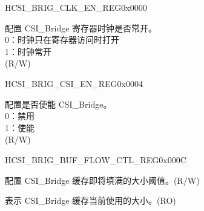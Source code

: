 \begin{register}{H}{CSI\_BRIG\_CLK\_EN\_REG}{0x0000}\label{regdesc:CSIBRIGCLKENREG}
%
%
\regnewline%
\begin{regdesc}\begin{reglist}
\label{fielddesc:CSIBRIGCLKEN}\item [CSI\_BRIG\_CLK\_EN] 配置 CSI\_Bridge 寄存器时钟是否常开。\\0：时钟只在寄存器访问时打开\\1：时钟常开\\(R/W)
\end{reglist}\end{regdesc}
\end{register}


\begin{register}{H}{CSI\_BRIG\_CSI\_EN\_REG}{0x0004}\label{regdesc:CSIBRIGCSIENREG}
%
%
\regnewline%
\begin{regdesc}\begin{reglist}
\label{fielddesc:CSIBRIGCSIBRIGEN}\item [CSI\_BRIG\_CSI\_BRIG\_EN] 配置是否使能 CSI\_Bridge。\\0：禁用\\1：使能\\(R/W)
\end{reglist}\end{regdesc}
\end{register}


\begin{register}{H}{CSI\_BRIG\_BUF\_FLOW\_CTL\_REG}{0x000C}\label{regdesc:CSIBRIGBUFFLOWCTLREG}
%
%
%
%
\regnewline%
\begin{regdesc}\begin{reglist}
\label{fielddesc:CSIBRIGCSIBUFAFULLTHRD}\item [CSI\_BRIG\_CSI\_BUF\_AFULL\_THRD] 配置 CSI\_Bridge 缓存即将填满的大小阈值。(R/W)
\label{fielddesc:CSIBRIGCSIBUFDEPTH}\item [CSI\_BRIG\_CSI\_BUF\_DEPTH] 表示 CSI\_Bridge 缓存当前使用的大小。(RO)
\end{reglist}\end{regdesc}
\end{register}



